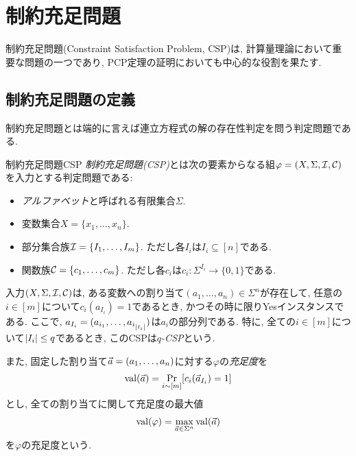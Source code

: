 \chapter{制約充足問題} \label{chap:CSP}
制約充足問題(Constraint Satisfaction Problem, CSP)は, 計算量理論において重要な問題の一つであり, PCP定理の証明においても中心的な役割を果たす.

\section{制約充足問題の定義}
制約充足問題とは端的に言えば連立方程式の解の存在性判定を問う判定問題である.

\begin{definition}{制約充足問題}{CSP}
\emph{制約充足問題(CSP)}とは次の要素からなる組$\varphi = (X,\Sigma,\mathcal{I},\mathcal{C})$を入力とする判定問題である:
\begin{itemize}
  \item \emph{アルファベット}と呼ばれる有限集合$\Sigma$.
  \item 変数集合$X=\{x_1,\dots,x_n\}$.
  \item 部分集合族$\mathcal{I}=\{I_1,\dots,I_m\}$. ただし各$I_i$は$I_i\subseteq[n]$である.
  \item 関数族$\mathcal{C}=\{c_1,\dots,c_m\}$. ただし各$c_i$は$c_i: \Sigma^{I_i}\to\{0,1\}$である.
\end{itemize}
入力$(X,\Sigma,\mathcal{I},\mathcal{C})$は,
ある変数への割り当て$(a_1,\dots,a_n)\in\Sigma^n$が存在して, 任意の$i\in[m]$について$c_i(a_{I_i})=1$であるとき, かつその時に限りYesインスタンスである.
ここで, $a_{I_i}=(a_{i_1},\dots,a_{i_{\abs{I_i}}})$は$a_i$の部分列である.
特に, 全ての$i\in[m]$について$\abs{I_i}\le q$であるとき, このCSPは\emph{$q$-CSP}という.

また, 固定した割り当て$\vec{a} = (a_1,\dots,a_n)$に対する$\varphi$の\emph{充足度}を
\begin{align*}
  \mathrm{val}(\vec{a}) = \Pr_{i\sim[m]}[c_i(\vec{a}_{I_i})=1]
\end{align*}
とし, 全ての割り当てに関して充足度の最大値
\begin{align*}
  \mathrm{val}(\varphi) = \max_{\vec{a}\in\Sigma^n} \mathrm{val}(\vec{a})
\end{align*}
を$\varphi$の充足度という.
\end{definition}

